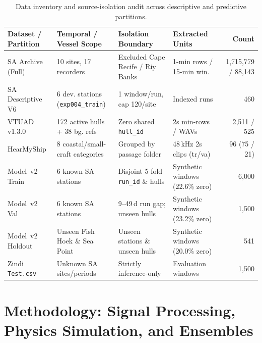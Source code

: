 \documentclass[10pt,a4paper]{article}
\begin{document}
\begin{table}[tbp]
\centering
\caption{Data inventory and source-isolation audit across descriptive and predictive partitions.}
\label{tab:inventory}
\footnotesize\setlength{\tabcolsep}{4pt}
\begin{tabular}{@{}llllr@{}}
\toprule
Dataset / Partition & Temporal / Vessel Scope & Isolation Boundary & Extracted Units & Count \\
\midrule
SA Archive (Full) & 10 sites, 17 recorders & Excluded Cape Recife / Riy Banks & 1-min rows / 15-min win. & 1,715,779 / 88,143 \\
SA Descriptive V6 & 6 dev. stations (\texttt{exp004\_train}) & 1 window/run, cap 120/site & Indexed runs & 460 \\
VTUAD v1.3.0 & 172 active hulls + 38 bg. refs & Zero shared \texttt{hull\_id} & 2s min-rows / WAVs & 2,511 / 525 \\
HearMyShip & 8 coastal/small-craft categories & Grouped by passage folder & 48\,kHz 2s clips (tr/va) & 96 (75 / 21) \\
Model~v2 Train & 6 known SA stations & Disjoint 5-fold \texttt{run\_id} \& hulls & Synthetic windows (22.6\% zero) & 6,000 \\
Model~v2 Val & 6 known SA stations & 9--49\,d run gap; unseen hulls & Synthetic windows (23.2\% zero) & 1,500 \\
Model~v2 Holdout & Unseen Fish Hoek \& Sea Point & Unseen stations \& unseen hulls & Synthetic windows (20.0\% zero) & 541 \\
Zindi \texttt{Test.csv} & Unknown SA sites/periods & Strictly inference-only & Evaluation windows & 1,500 \\
\bottomrule
\end{tabular}
\end{table}

\section{Methodology: Signal Processing, Physics Simulation, and Ensembles}
\end{document}
